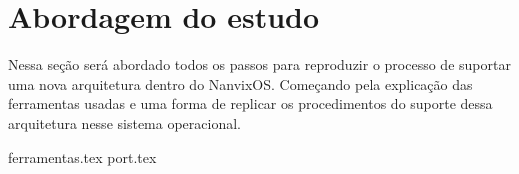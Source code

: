 \section{Abordagem do estudo}

Nessa seção será abordado todos os passos para reproduzir o processo de suportar uma nova arquitetura dentro do NanvixOS. Começando pela 
explicação das ferramentas usadas e uma forma de replicar os procedimentos do suporte dessa arquitetura nesse sistema operacional.

{ferramentas.tex}
{port.tex}